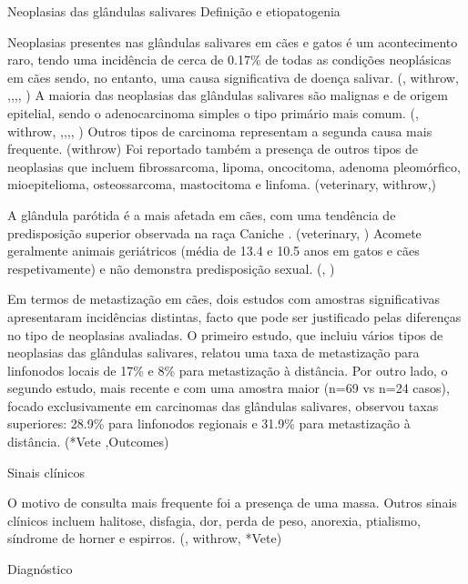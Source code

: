   
Neoplasias das glândulas salivares
Definição e etiopatogenia


Neoplasias presentes nas glândulas salivares em cães e gatos é um acontecimento raro, tendo uma incidência de cerca de 0.17\% de todas as condições neoplásicas em cães sendo, no entanto, uma causa significativa de doença salivar. (\cite{Almeida2010}, withrow, \cite{Oshikata2006},\cite{Hammer2001},\cite{campos2019},\cite{Cray2020}, \cite{deLaPuerta2020}) A maioria das neoplasias das glândulas salivares são malignas e de origem epitelial, sendo o adenocarcinoma simples o tipo primário mais comum. (\cite{Almeida2010}, withrow, \cite{Oshikata2006},\cite{Hammer2001},\cite{campos2019},\cite{Cray2020}, \cite{deLaPuerta2020}) Outros tipos de carcinoma representam a segunda causa mais frequente. (withrow) Foi reportado também a presença de outros tipos de neoplasias que incluem fibrossarcoma, lipoma, oncocitoma, adenoma pleomórfico, mioepitelioma, osteossarcoma, mastocitoma e linfoma. (veterinary, withrow,\cite{Cray2020})


A glândula parótida é a mais afetada em cães, com uma tendência de predisposição superior  observada na raça Caniche . (veterinary, \cite{Oshikata2006}) Acomete geralmente animais geriátricos (média de 13.4 e 10.5 anos em gatos e cães respetivamente) e não demonstra predisposição sexual. (\cite{Cray2020}, \cite{deLaPuerta2020})


Em termos de metastização em cães, dois estudos com amostras significativas apresentaram incidências distintas, facto que pode ser justificado pelas diferenças no tipo de neoplasias avaliadas. O primeiro estudo, que incluiu vários tipos de neoplasias das glândulas salivares, relatou uma taxa de metastização para linfonodos locais de 17\% e 8\% para metastização à distância. Por outro lado, o segundo estudo, mais recente e com uma amostra maior (n=69 vs n=24 casos), focado exclusivamente em carcinomas das glândulas salivares, observou taxas superiores: 28.9\% para linfonodos regionais e 31.9\% para metastização à distância. (*Vete ,Outcomes)


Sinais clínicos


O motivo de consulta mais frequente foi a presença de uma massa. Outros sinais clínicos incluem halitose, disfagia, dor, perda de peso, anorexia, ptialismo, síndrome de horner e espirros. (\cite{Dobson2011}, withrow, *Vete) 


Diagnóstico


